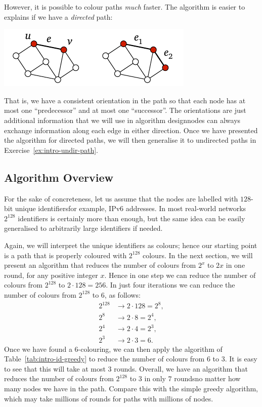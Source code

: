 However, it is possible to colour paths \emph{much} faster. The algorithm is easier to explains if we have a \emph{directed} path:
\begin{center}
    \includegraphics[page=\PIntroIdDir]{figs.pdf}
\end{center}
That is, we have a consistent orientation in the path so that each node has at most one ``predecessor'' and at most one ``successor''. The orientations are just additional information that we will use in algorithm design\mydash nodes can always exchange information along each edge in either direction. Once we have presented the algorithm for directed paths, we will then generalise it to undirected paths in Exercise~\ref{ex:intro-undir-path}.


\subsection{Algorithm Overview}

For the sake of concreteness, let us assume that the nodes are labelled with $128$-bit unique identifiers\mydash for example, IPv6 addresses. In most real-world networks $2^{128}$ identifiers is certainly more than enough, but the same idea can be easily generalised to arbitrarily large identifiers if needed.

Again, we will interpret the unique identifiers as colours; hence our starting point is a path that is properly coloured with $2^{128}$ colours. In the next section, we will present an algorithm that reduces the number of colours from $2^x$ to $2x$ in one round, for any positive integer $x$. Hence in one step we can reduce the number of colours from $2^{128}$ to $2 \cdot 128 = 256$. In just four iterations we can reduce the number of colours from $2^{128}$ to $6$, as follows:
\begin{align*}
    2^{128} &\to 2 \cdot 128 = 2^8, \\
    2^8 &\to 2 \cdot 8 = 2^4, \\
    2^4 &\to 2 \cdot 4 = 2^3, \\
    2^3 &\to 2 \cdot 3 = 6.
\end{align*}
Once we have found a $6$-colouring, we can then apply the algorithm of Table~\ref{tab:intro-id-greedy} to reduce the number of colours from $6$ to $3$. It is easy to see that this will take at most $3$ rounds. Overall, we have an algorithm that reduces the number of colours from $2^{128}$ to $3$ in only $7$ rounds\mydash no matter how many nodes we have in the path. Compare this with the simple greedy algorithm, which may take millions of rounds for paths with millions of nodes.


